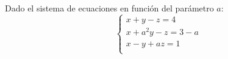 \documentclass[addpoints,spanish, 12pt,a4paper]{exam}
\begin{document}
\begin{questions}

\question Dado el sistema de ecuaciones en función del parámetro $a$:$$\left\{ \begin{matrix}x + y - z = 4 \\ x + a^{2} y - z = 3 - a \\  x - y + a z = 1 \\ \end{matrix}\right.$$
\end{questions}
\end{document}
